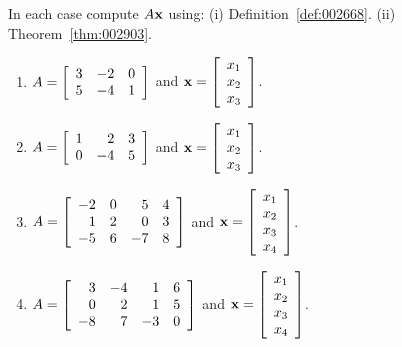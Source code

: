 \begin{multicols}{2}
\begin{ex}
\begin{sol}
\begin{enumerate}[label={\alph*.}]
\end{enumerate}
\end{sol}
\end{ex}

\begin{ex}
In each case compute $A\textbf{x}$ using: (i) Definition~\ref{def:002668}. (ii) Theorem~\ref{thm:002903}.


\begin{enumerate}[label={\alph*.}]
\item 
$A = \left[ \begin{array}{rrr}
3 & -2 & 0 \\
5 & -4 & 1
\end{array} \right] $ and $\textbf{x} = \left[ \begin{array}{c}
x_{1} \\
x_{2} \\
x_{3}
\end{array} \right]$.

\item 
$A = \left[ \begin{array}{rrr}
1 & 2 & 3 \\
0 & -4 & 5
\end{array} \right]$ and $\textbf{x} = \left[ \begin{array}{c}
x_{1} \\
x_{2} \\
x_{3}
\end{array} \right]$.


\item
$A = \left[ \begin{array}{rrrr}
-2 & 0 & 5 & 4 \\
1 & 2 & 0 & 3 \\
-5 & 6 & -7 & 8
\end{array} \right]$ and $\textbf{x} = \left[ \begin{array}{c}
x_{1} \\
x_{2} \\
x_{3} \\
x_{4}
\end{array} \right]$.

\item
$A = \left[ \begin{array}{rrrr}
3 & -4 & 1 & 6 \\
0 & 2 & 1 & 5 \\
-8 & 7 & -3 & 0
\end{array} \right]$ and $\textbf{x} = \left[ \begin{array}{c}
x_{1} \\
x_{2} \\
x_{3} \\
x_{4}
\end{array} \right]$.


\end{enumerate}
\end{ex}
\end{multicols}

